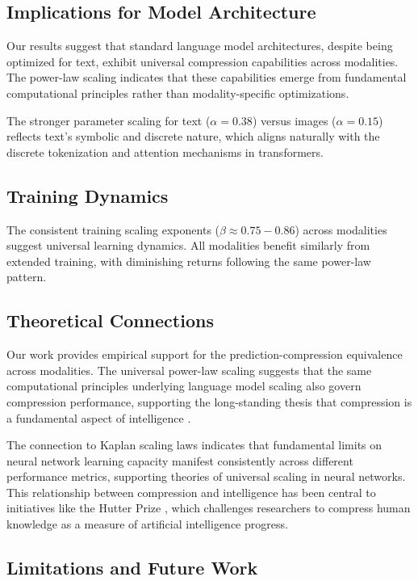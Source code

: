 \documentclass[11pt]{article}
\begin{document}
\subsection{Implications for Model Architecture}

Our results suggest that standard language model architectures, despite being optimized for text, exhibit universal compression capabilities across modalities. The power-law scaling indicates that these capabilities emerge from fundamental computational principles rather than modality-specific optimizations.

The stronger parameter scaling for text ($\alpha = 0.38$) versus images ($\alpha = 0.15$) reflects text's symbolic and discrete nature, which aligns naturally with the discrete tokenization and attention mechanisms in transformers.

\subsection{Training Dynamics}

The consistent training scaling exponents ($\beta \approx 0.75-0.86$) across modalities suggest universal learning dynamics. All modalities benefit similarly from extended training, with diminishing returns following the same power-law pattern.

\subsection{Theoretical Connections}

Our work provides empirical support for the prediction-compression equivalence across modalities. The universal power-law scaling suggests that the same computational principles underlying language model scaling also govern compression performance, supporting the long-standing thesis that compression is a fundamental aspect of intelligence \citep{hutter2012human}.

The connection to Kaplan scaling laws indicates that fundamental limits on neural network learning capacity manifest consistently across different performance metrics, supporting theories of universal scaling in neural networks. This relationship between compression and intelligence has been central to initiatives like the Hutter Prize \citep{hutter2006human}, which challenges researchers to compress human knowledge as a measure of artificial intelligence progress.

\subsection{Limitations and Future Work}
\end{document}
